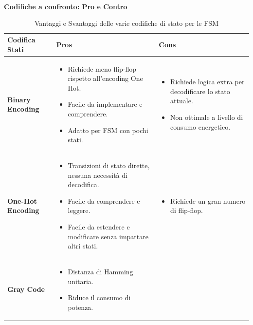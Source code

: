 \documentclass[a4paper,11pt]{article}
\begin{document}
\newpage\textbf{Codifiche a confronto: Pro e Contro} \\
\begin{table}[!htbp]
    \centering
    \caption{Vantaggi e Svantaggi delle varie codifiche di stato per le FSM}
    \label{tab:FSM_encoding}
    \begin{tabular}{p{3cm}p{6cm}p{6cm}}
        \toprule
        \textbf{Codifica Stati} & \textbf{Pros} & \textbf{Cons} \\
        \midrule
        \textbf{Binary Encoding} & \begin{itemize}
                            \item Richiede meno flip-flop rispetto all'encoding One Hot.
                            \item Facile da implementare e comprendere.
                            \item Adatto per FSM con pochi stati.
                         \end{itemize} 
                        & \begin{itemize}
                            \item Richiede logica extra per decodificare lo stato attuale.
                            \item Non ottimale a livello di consumo energetico.
                          \end{itemize} \\
        \textbf{One-Hot Encoding} & \begin{itemize}
                            \item Transizioni di stato dirette, nessuna necessità di decodifica.
                            \item Facile da comprendere e leggere.
                            \item Facile da estendere e modificare senza impattare altri stati.
                          \end{itemize} 
                        & \begin{itemize}
                            \item Richiede un gran numero di flip-flop.
                          \end{itemize} \\
        \textbf{Gray Code} & \begin{itemize}
                            \item Distanza di Hamming unitaria.
                            \item Riduce il consumo di potenza.

\end{itemize}
\end{tabular}
\end{table}
\end{document}
